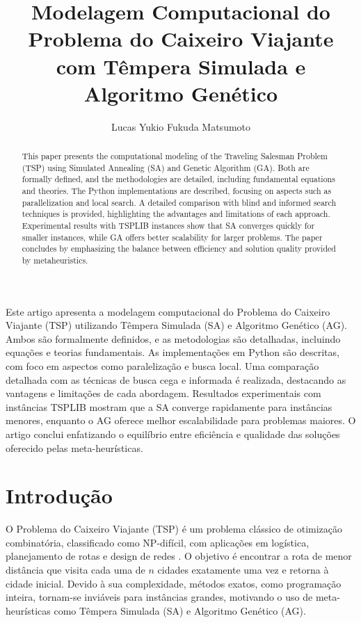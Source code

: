 \documentclass[12pt]{article}
\title{Modelagem Computacional do Problema do Caixeiro Viajante com Têmpera Simulada e Algoritmo Genético}
\author{Lucas Yukio Fukuda Matsumoto\inst{1}}
\begin{document}
\maketitle

\begin{resumo}
Este artigo apresenta a modelagem computacional do Problema do Caixeiro Viajante (TSP) utilizando Têmpera Simulada (SA) e Algoritmo Genético (AG). Ambos são formalmente definidos, e as metodologias são detalhadas, incluindo equações e teorias fundamentais. As implementações em Python são descritas, com foco em aspectos como paralelização e busca local. Uma comparação detalhada com as técnicas de busca cega e informada é realizada, destacando as vantagens e limitações de cada abordagem. Resultados experimentais com instâncias TSPLIB mostram que a SA converge rapidamente para instâncias menores, enquanto o AG oferece melhor escalabilidade para problemas maiores. O artigo conclui enfatizando o equilíbrio entre eficiência e qualidade das soluções oferecido pelas meta-heurísticas.
\end{resumo}

\begin{abstract}
This paper presents the computational modeling of the Traveling Salesman Problem (TSP) using Simulated Annealing (SA) and Genetic Algorithm (GA). Both are formally defined, and the methodologies are detailed, including fundamental equations and theories. The Python implementations are described, focusing on aspects such as parallelization and local search. A detailed comparison with blind and informed search techniques is provided, highlighting the advantages and limitations of each approach. Experimental results with TSPLIB instances show that SA converges quickly for smaller instances, while GA offers better scalability for larger problems. The paper concludes by emphasizing the balance between efficiency and solution quality provided by metaheuristics.
\end{abstract}

\section{Introdução}
O Problema do Caixeiro Viajante (TSP) é um problema clássico de otimização combinatória, classificado como NP-difícil, com aplicações em logística, planejamento de rotas e design de redes \cite{applegate2006}. O objetivo é encontrar a rota de menor distância que visita cada uma de \(n\) cidades exatamente uma vez e retorna à cidade inicial. Devido à sua complexidade, métodos exatos, como programação inteira, tornam-se inviáveis para instâncias grandes, motivando o uso de meta-heurísticas como Têmpera Simulada (SA) e Algoritmo Genético (AG).
\end{document}
